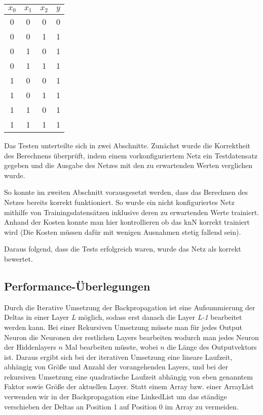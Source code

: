 \documentclass[paper=A4,pagesize=auto,12pt,headinclude=true,footinclude=true,BCOR=0mm,DIV=calc]{scrartcl}
\begin{document}
\begin{center}
\begin{tabular}{|c|c|c|c|}
	$x_0$ & $x_1$ & $x_2$ & $y$ \\
	\hline\hline
	0 & 0 & 0 & 0 \\ \hline
	0 & 0 & 1 & 1 \\ \hline
	0 & 1 & 0 & 1 \\ \hline
	0 & 1 & 1 & 1 \\ \hline
	1 & 0 & 0 & 1 \\ \hline
	1 & 0 & 1 & 1 \\ \hline
	1 & 1 & 0 & 1 \\ \hline
	1 & 1 & 1 & 1 \\ \hline
\end{tabular}
\end{center}
Das Testen unterteilte sich in zwei Abschnitte. Zunächst wurde die Korrektheit des Berechnens überprüft, indem einem vorkonfiguriertem Netz ein Testdatensatz gegeben und die Ausgabe des Netzes mit den zu erwartenden Werten verglichen wurde.

So konnte im zweiten Abschnitt vorausgesetzt werden, dass das Berechnen des Netzes bereits korrekt funktioniert. So wurde ein nicht konfiguriertes Netz mithilfe von Trainingsdatensätzen inklusive deren zu erwartenden Werte trainiert. Anhand der Kosten konnte man hier kontrollieren ob das knN korrekt trainiert wird (Die Kosten müssen dafür mit wenigen Ausnahmen stetig fallend sein). 

Daraus folgend, dass die Tests erfolgreich waren, wurde das Netz als korrekt bewertet.

\subsection{Performance-Überlegungen}
Durch die Iterative Umsetzung der Backpropagation ist eine Aufsummierung der Deltas in einer Layer \textit{L} möglich, sodass erst danach die Layer \textit{L-1} bearbeitet werden kann. Bei einer Rekursiven Umsetzung müsste man für jedes Output Neuron die Neuronen der restlichen Layers bearbeiten wodurch man jedes Neuron der Hiddenlayers $n$ Mal bearbeiten müsste, wobei $n$ die Länge des Outputvektors ist. Daraus ergibt sich bei der iterativen Umsetzung eine lineare Laufzeit, abhängig von Größe und Anzahl der vorangehenden Layers, und bei der rekursiven Umsetzung eine quadratische Laufzeit abhängig von eben genanntem Faktor sowie Größe der aktuellen Layer.
Statt einem Array bzw. einer ArrayList verwenden wir in der Backpropagation eine LinkedList um das ständige verschieben der Deltas an Position 1 auf Position 0 im Array zu vermeiden.
\end{document}

